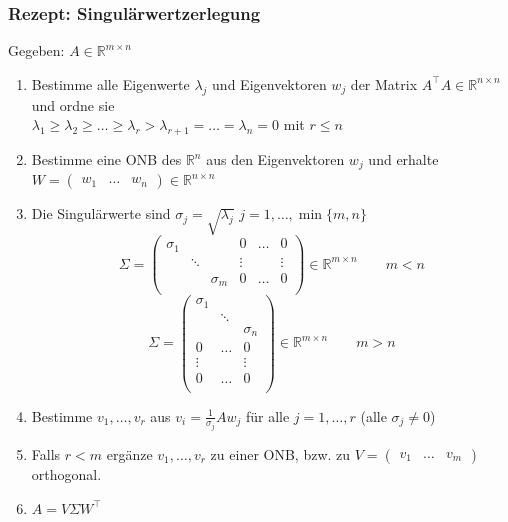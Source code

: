 \documentclass[6pt,a4paper]{scrartcl}
\begin{document}
\begin{multicols*}{4}
\subsubsection{Rezept: Singulärwertzerlegung}
Gegeben: $A\in \mathbb{R}^{m\times n}$
\begin{enumerate}\itemsep0pt
\item Bestimme alle Eigenwerte $\lambda_j$ und Eigenvektoren $w_j$ der Matrix $A^\top A\in \mathbb{R}^{n\times n}$ und ordne sie \\ $\lambda_1\ge\lambda_2\ge \dots \ge \lambda_r>\lambda_{r+1}=\dots=\lambda_n=0$ mit $r\le n$
\item Bestimme eine ONB des $\mathbb{R}^n$ aus den Eigenvektoren $w_j$ und erhalte $W=\begin{pmatrix} 
w_1 &\dots & w_n
\end{pmatrix} \in \mathbb{R}^{n\times n}$
\item Die Singulärwerte sind $\sigma_j=\sqrt{\lambda_j}$ \qquad $j=1,\dots,\min\{m,n\}$
\begin{equation*}
\Sigma=\begin{pmatrix}
\sigma_1 & & & 0 & \dots & 0\\
 & \ddots & &  \vdots &  &  \vdots\\
& & \sigma_m & 0 & \dots & 0\\
\end{pmatrix} \in \mathbb{R}^{m\times n}
\qquad m<n
\end{equation*}
\begin{equation*}
\Sigma=\begin{pmatrix}
\sigma_1 & & \\
 & \ddots & \\
& & \sigma_n \\
0 & \dots & 0\\
\vdots &  &  \vdots\\
0 & \dots & 0\\
\end{pmatrix} \in \mathbb{R}^{m\times n}
\qquad m>n
\end{equation*}
\item Bestimme $v_1,\dots,v_r$ aus $v_i=\frac{1}{\sigma_j}Aw_j$ für alle $j=1,\dots,r$ (alle $\sigma_j\ne 0$)
\item Falls $r<m$ ergänze $v_1,\dots,v_r$ zu einer ONB, bzw. zu $V=\begin{pmatrix}
v_1 & \dots & v_m
\end{pmatrix}$
orthogonal.
\item $A=V\Sigma W^\top$
\end{enumerate}

\end{multicols*}
\end{document}
